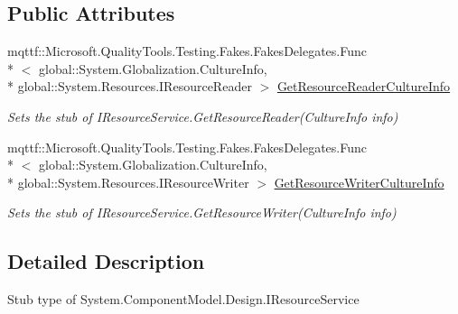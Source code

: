\subsection*{Public Attributes}
\begin{DoxyCompactItemize}
\item 
mqttf\-::\-Microsoft.\-Quality\-Tools.\-Testing.\-Fakes.\-Fakes\-Delegates.\-Func\\*
$<$ global\-::\-System.\-Globalization.\-Culture\-Info, \\*
global\-::\-System.\-Resources.\-I\-Resource\-Reader $>$ \hyperlink{class_system_1_1_component_model_1_1_design_1_1_fakes_1_1_stub_i_resource_service_ab331a07c803094adb2d26962a4c21c60}{Get\-Resource\-Reader\-Culture\-Info}
\begin{DoxyCompactList}\small\item\em Sets the stub of I\-Resource\-Service.\-Get\-Resource\-Reader(\-Culture\-Info info)\end{DoxyCompactList}\item 
mqttf\-::\-Microsoft.\-Quality\-Tools.\-Testing.\-Fakes.\-Fakes\-Delegates.\-Func\\*
$<$ global\-::\-System.\-Globalization.\-Culture\-Info, \\*
global\-::\-System.\-Resources.\-I\-Resource\-Writer $>$ \hyperlink{class_system_1_1_component_model_1_1_design_1_1_fakes_1_1_stub_i_resource_service_a64f2c2fe1cb85fa309456d71ad684133}{Get\-Resource\-Writer\-Culture\-Info}
\begin{DoxyCompactList}\small\item\em Sets the stub of I\-Resource\-Service.\-Get\-Resource\-Writer(\-Culture\-Info info)\end{DoxyCompactList}\end{DoxyCompactItemize}


\subsection{Detailed Description}
Stub type of System.\-Component\-Model.\-Design.\-I\-Resource\-Service




